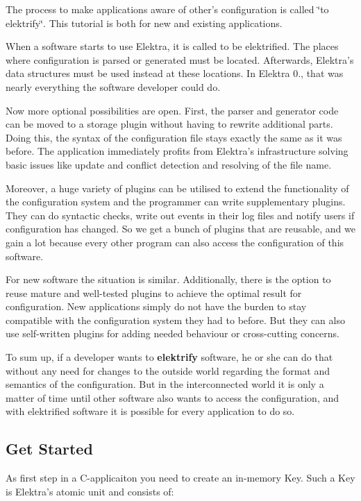 The process to make applications aware of other's configuration is called \char`\"{}to elektrify\char`\"{}. This tutorial is both for new and existing applications.

When a software starts to use Elektra, it is called to be elektrified. The places where configuration is parsed or generated must be located. Afterwards, Elektra's data structures must be used instead at these locations. In Elektra 0., that was nearly everything the software developer could do.

Now more optional possibilities are open. First, the parser and generator code can be moved to a storage plugin without having to rewrite additional parts. Doing this, the syntax of the configuration file stays exactly the same as it was before. The application immediately profits from Elektra's infrastructure solving basic issues like update and conflict detection and resolving of the file name.

Moreover, a huge variety of plugins can be utilised to extend the functionality of the configuration system and the programmer can write supplementary plugins. They can do syntactic checks, write out events in their log files and notify users if configuration has changed. So we get a bunch of plugins that are reusable, and we gain a lot because every other program can also access the configuration of this software.

For new software the situation is similar. Additionally, there is the option to reuse mature and well-\/tested plugins to achieve the optimal result for configuration. New applications simply do not have the burden to stay compatible with the configuration system they had to before. But they can also use self-\/written plugins for adding needed behaviour or cross-\/cutting concerns.

To sum up, if a developer wants to {\bfseries elektrify} software, he or she can do that without any need for changes to the outside world regarding the format and semantics of the configuration. But in the interconnected world it is only a matter of time until other software also wants to access the configuration, and with elektrified software it is possible for every application to do so.

\subsection*{Get Started}

As first step in a C-\/applicaiton you need to create an in-\/memory {\ttfamily Key}. Such a {\ttfamily Key} is Elektra's atomic unit and consists of\+:


